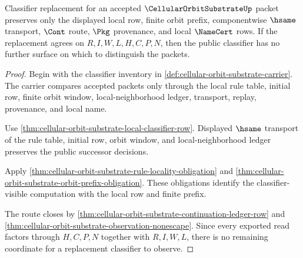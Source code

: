\begin{theorem}
\label{thm:cellular-orbit-substrate-classifier-stability-obligation}
Classifier replacement for an accepted $\CellularOrbitSubstrateUp$ packet preserves only the displayed local row, finite orbit prefix, componentwise $\hsame$ transport, $\Cont$ route, $\Pkg$ provenance, and local $\NameCert$ rows. If the replacement agrees on $R,I,W,L,H,C,P,N$, then the public classifier has no further surface on which to distinguish the packets.
\end{theorem}
\begin{proof}
Begin with the classifier inventory in \autoref{def:cellular-orbit-substrate-carrier}. The carrier compares accepted packets only through the local rule table, initial row, finite orbit window, local-neighborhood ledger, transport, replay, provenance, and local name.

Use \autoref{thm:cellular-orbit-substrate-local-classifier-row}. Displayed $\hsame$ transport of the rule table, initial row, orbit window, and local-neighborhood ledger preserves the public successor decisions.

Apply \autoref{thm:cellular-orbit-substrate-rule-locality-obligation} and \autoref{thm:cellular-orbit-substrate-orbit-prefix-obligation}. These obligations identify the classifier-visible computation with the local row and finite prefix.

The route closes by \autoref{thm:cellular-orbit-substrate-continuation-ledger-row} and \autoref{thm:cellular-orbit-substrate-observation-nonescape}. Since every exported read factors through $H,C,P,N$ together with $R,I,W,L$, there is no remaining coordinate for a replacement classifier to observe.
\end{proof}

